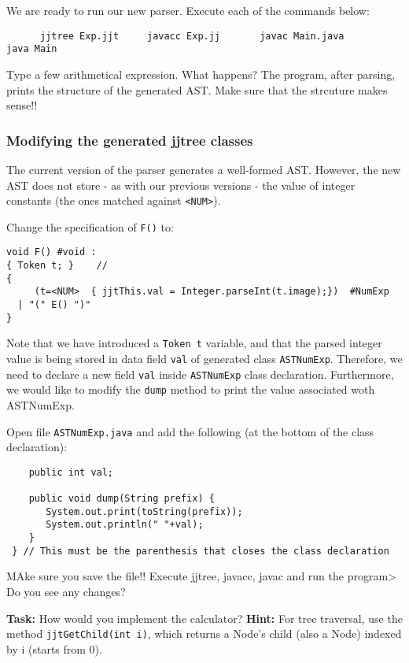 \documentclass{article}
\begin{document}
We are ready to run our new parser. Execute each of the commands below:

\begin{verbatim}
      jjtree Exp.jjt     javacc Exp.jj       javac Main.java        java Main      
\end{verbatim}

Type a few arithmetical expression. What happens? The program, after parsing, prints the structure of the generated AST. Make sure that the strcuture makes sense!!

\subsubsection*{Modifying the generated jjtree classes}

The current version of the parser generates a well-formed AST. However, the new AST does not store - as with our previous versions - the value of integer constants (the ones matched against \verb+<NUM>+). 

Change the specification of {\tt F()} to:
\begin{verbatim}
void F() #void :
{ Token t; }    // 
{
     (t=<NUM>  { jjtThis.val = Integer.parseInt(t.image);})  #NumExp
  | "(" E() ")"
}
\end{verbatim}

Note that we have introduced a {\tt Token t} variable, and that the parsed integer value is being stored in data field {\tt val} of generated class {\tt ASTNumExp}. Therefore, we need to declare a new field {\tt val} inside {\tt ASTNumExp} class declaration. Furthermore, we would like to modify the {\tt dump} method to print the value associated woth ASTNumExp.

Open file {\tt ASTNumExp.java} and add the following (at the bottom of the class declaration):

\begin{verbatim}
    public int val;

    public void dump(String prefix) {
       System.out.print(toString(prefix));
       System.out.println(" "+val);
    }
 } // This must be the parenthesis that closes the class declaration
\end{verbatim}

MAke sure you save the file!! Execute jjtree, javacc, javac and run the program>
Do you see any changes?

\noindent\textbf{Task:} How would you implement the calculator? \textbf{Hint:} For tree traversal, use the method {\verb+jjtGetChild(int i)+}, which returns a Node's child (also a Node) indexed by i (starts from 0).
\end{document}

